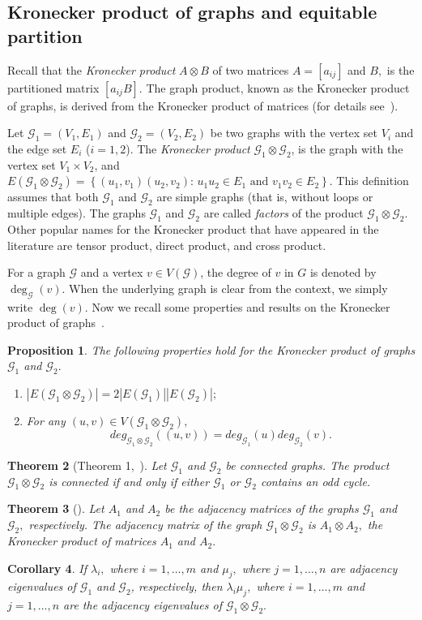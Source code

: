 \documentclass[11pt]{article}
\def \G {{\mathcal G}}
\newtheorem{theorem}{Theorem}[section]
\newtheorem{cor}[theorem]{Corollary}
\newtheorem{pro}[theorem]{Proposition}
\begin{document}
\subsection{Kronecker product of graphs and equitable partition}
Recall that the \emph{Kronecker product} $A\otimes B$ of two matrices $A = [a_{ij}]$ and $B, $ is the partitioned matrix $[a_{ij}B]$. The graph product, known as the Kronecker product of graphs, is derived from the
Kronecker product of matrices (for details see~\cite{kronecker}). 

 Let $\G_1 = (V_1, E_1)$ and $\G_2 = (V_2, E_2)$ be two graphs with the vertex set $V_i$ and the edge set $E_i$ ($i=1,2$). 
The \emph{Kronecker product} $\G_1 \otimes \G_2$, is the graph with the vertex set $V_1 \times V_2$, and $E(\G_1\otimes \G_2)=\left\{(u_1, v_1) (u_2, v_2):\, u_1u_2\in E_1 \text{ and } v_1v_2\in E_2  \right\}.$
This definition assumes that both $\G_1$ and $\G_2$ are simple graphs (that is, without loops or multiple edges).
The graphs $\G_1$ and $\G_2$ are called \emph{factors} of the product
$\G_1\otimes \G_2.$ Other popular names for the Kronecker product that have appeared in the literature are tensor
product, direct product, and cross product.

For a graph \(\G\) and a vertex \(v \in V(\G)\), the degree of \(v\) in \(G\) is denoted by \(\deg_\G(v)\). When the underlying graph is clear from the context, we simply write \(\deg(v)\). 
Now we recall some properties and results on the Kronecker product of graphs~\cite{kronecker}.

\begin{pro}\label{pro:per}
    The following properties hold for the Kronecker product of graphs $\G_1$ and $\G_2.$
    \begin{enumerate}
        \item $|E(\G_1\otimes \G_2)|=2|E(\G_1)||E(\G_2)|;$
        \item For any $(u,v)\in V(\G_1\otimes \G_2),$ 
        $$deg_{\G_1\otimes \G_2}(\left(u,v\right))=deg_{\G_1}(u)deg_{\G_2}(v).$$
    \end{enumerate}
\end{pro}
\begin{theorem}[Theorem 1,~\cite{kronecker}]\label{thm:kcon}
Let $\G_1$ and $\G_2$ be connected graphs. The product $\G_1\otimes \G_2$ is connected if and only if either $\G_1$ or $\G_2$ contains an odd cycle. 
\end{theorem}
\begin{theorem}[\cite{kronecker}] \label{thm:kadd}
    Let $A_1$ and $A_2$ be the adjacency matrices of the graphs $\G_1$ and $\G_2,$ respectively. The adjacency matrix of the graph $\G_1\otimes \G_2$ is $A_1\otimes A_2,$ the Kronecker product of matrices $A_1$ and $A_2.$
\end{theorem}
\begin{cor}\label{cor:kspec}
   If $\lambda_i,$ where $ i = 1, \ldots, m$ and $\mu_j,$ where $ j = 1, \ldots, n$ are adjacency eigenvalues of $\G_1$ and $\G_2$, respectively, then $\lambda_i \mu_j,$ where $ i = 1, \ldots, m$ and $ j = 1, \ldots, n$ are the adjacency eigenvalues of $\G_1 \otimes \G_2.$
\end{cor}
\end{document}
